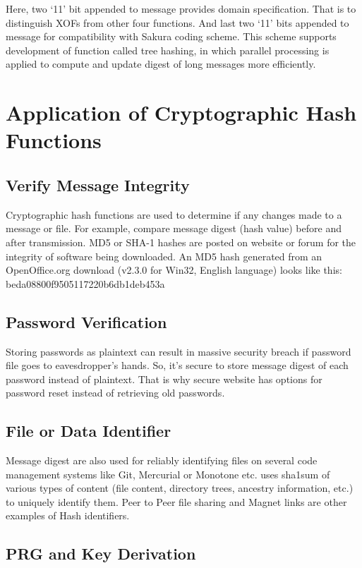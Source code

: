 Here, two `11' bit appended to message provides domain specification. That is to distinguish XOFs from other four functions. And last two `11' bits appended to message for compatibility with Sakura coding scheme. This scheme supports development of function called tree hashing, in which parallel processing is applied to compute and update digest of long messages more efficiently\cite{sha3ref}.


\section{Application of Cryptographic Hash Functions}

\subsection{Verify Message Integrity}

Cryptographic hash functions are used to determine if any changes made to a message or file. For example, compare message digest (hash value) before and after transmission. MD5 or SHA-1 hashes are posted on website or forum for the integrity of software being downloaded. An MD5 hash generated from an OpenOffice.org download (v2.3.0 for Win32, English language) looks like this: beda08800f9505117220b6db1deb453a

\subsection{Password Verification}

Storing passwords as plaintext can result in massive security breach if password file goes to eavesdropper’s hands. So, it’s secure to store message digest of each password instead of plaintext. That is why secure website has options for password reset instead of retrieving old passwords. 

\subsection{File or Data Identifier}

Message digest are also used for reliably identifying files on several code management systems like Git, Mercurial or Monotone etc. uses sha1sum of various types of content (file content, directory trees, ancestry information, etc.) to uniquely identify them. Peer to Peer file sharing and Magnet links are other examples of Hash identifiers.

\subsection{PRG and Key Derivation}


